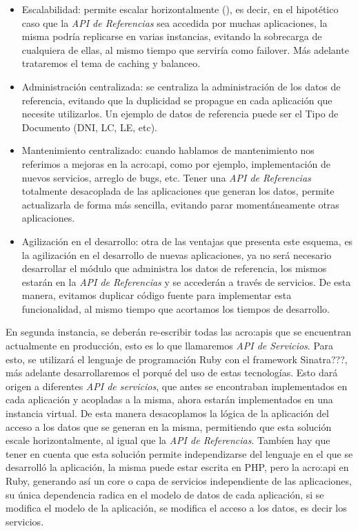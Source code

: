 \begin{itemize}
  \item Escalabilidad: permite escalar horizontalmente (), es decir, en el hipotético caso que la \textit{API de Referencias} sea accedida por muchas aplicaciones, la misma podría replicarse en varias instancias, evitando la sobrecarga de cualquiera de ellas, al mismo tiempo que serviría como failover.  Más adelante trataremos el tema de caching y balanceo.

  \item Administración centralizada: se centraliza la administración de los datos de referencia, evitando que la duplicidad se propague en cada aplicación que necesite utilizarlos.  Un ejemplo de datos de referencia puede ser el Tipo de Documento (DNI, LC, LE, etc).

  \item Mantenimiento centralizado: cuando hablamos de mantenimiento nos referimos a mejoras en la \gls{acro:api}, como por ejemplo, implementación de nuevos servicios, arreglo de bugs, etc.  Tener una \textit{API de Referencias} totalmente desacoplada de las aplicaciones que generan los datos, permite actualizarla de forma más sencilla, evitando parar momentáneamente otras aplicaciones.

  \item Agilización en el desarrollo: otra de las ventajas que presenta este esquema, es la agilización en el desarrollo de nuevas aplicaciones, ya no será necesario desarrollar el módulo que administra los datos de referencia, los mismos estarán en la \textit{API de Referencias} y se accederán a través de servicios.  De esta manera, evitamos duplicar código fuente para implementar esta funcionalidad, al mismo tiempo que acortamos los tiempos de desarrollo.
\end{itemize}

En segunda instancia, se deberán re-escribir todas las \glspl{acro:api} que se encuentran actualmente en producción, esto es lo que llamaremos \textit{API de Servicios}.  Para esto, se utilizará el lenguaje de programación Ruby con el framework Sinatra???, más adelante desarrollaremos el porqué del uso de estas tecnologías.  Esto dará origen a diferentes \textit{API de servicios}, que antes se encontraban implementados en cada aplicación y acopladas a la misma, ahora estarán implementados en una instancia virtual.
De esta manera desacoplamos la lógica de la aplicación del acceso a los datos que se generan en la misma, permitiendo que esta solución escale horizontalmente, al igual que la \textit{API de Referencias}.
Tambíen hay que tener en cuenta que esta solución permite independizarse del lenguaje en el que se desarrolló la aplicación, la misma puede estar escrita en PHP, pero la \gls{acro:api} en Ruby, generando así un core o capa de servicios independiente de las aplicaciones, su única dependencia radica en el modelo de datos de cada aplicación, si se modifica el modelo de la aplicación, se modifica el acceso a los datos, es decir los servicios.

